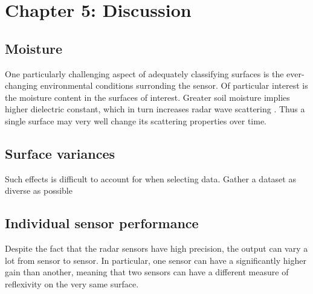 \documentclass[a4paper, 12pt]{article}
\begin{document}
\section{Chapter 5: Discussion}


\subsection{Moisture}

One particularly challenging aspect of adequately classifying surfaces is the ever-changing environmental conditions surronding the sensor. Of particular interest is the moisture content in the surfaces of interest. Greater soil moisture implies higher dielectric constant, which in turn increases radar wave scattering \citep{rappaport_2006}. Thus a single surface may very well change its scattering properties over time. 


\subsection{Surface variances}

Such effects is difficult to account for when selecting data. Gather a dataset as diverse as possible

\subsection{Individual sensor performance}
Despite the fact that the radar sensors have high precision, the output can vary a lot from sensor to sensor. In particular, one sensor can have a significantly higher gain than another, meaning that two sensors can have a different measure of reflexivity on the very same surface. 



\end{document}
